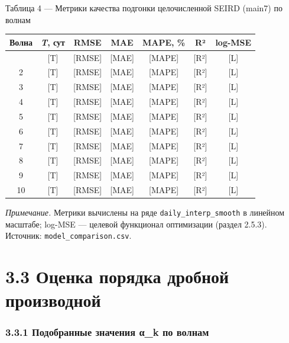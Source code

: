 \documentclass[12pt]{article}
\begin{document}
Таблица 4 --- Метрики качества подгонки целочисленной SEIRD (main7) по
волнам

{\def\LTcaptype{none} %
\begin{longtable}[]{@{}ccccccc@{}}
\toprule\noalign{}
Волна & \emph{T}, сут & RMSE & MAE & MAPE, \% & R² & log-MSE \\
\midrule\noalign{}
\endhead
\bottomrule\noalign{}
\endlastfoot
1 & {[}T{]} & {[}RMSE{]} & {[}MAE{]} & {[}MAPE{]} & {[}R²{]} &
{[}L{]} \\
2 & {[}T{]} & {[}RMSE{]} & {[}MAE{]} & {[}MAPE{]} & {[}R²{]} &
{[}L{]} \\
3 & {[}T{]} & {[}RMSE{]} & {[}MAE{]} & {[}MAPE{]} & {[}R²{]} &
{[}L{]} \\
4 & {[}T{]} & {[}RMSE{]} & {[}MAE{]} & {[}MAPE{]} & {[}R²{]} &
{[}L{]} \\
5 & {[}T{]} & {[}RMSE{]} & {[}MAE{]} & {[}MAPE{]} & {[}R²{]} &
{[}L{]} \\
6 & {[}T{]} & {[}RMSE{]} & {[}MAE{]} & {[}MAPE{]} & {[}R²{]} &
{[}L{]} \\
7 & {[}T{]} & {[}RMSE{]} & {[}MAE{]} & {[}MAPE{]} & {[}R²{]} &
{[}L{]} \\
8 & {[}T{]} & {[}RMSE{]} & {[}MAE{]} & {[}MAPE{]} & {[}R²{]} &
{[}L{]} \\
9 & {[}T{]} & {[}RMSE{]} & {[}MAE{]} & {[}MAPE{]} & {[}R²{]} &
{[}L{]} \\
10 & {[}T{]} & {[}RMSE{]} & {[}MAE{]} & {[}MAPE{]} & {[}R²{]} &
{[}L{]} \\
\end{longtable}
}

\emph{Примечание.} Метрики вычислены на ряде
\texttt{daily\_interp\_smooth} в линейном масштабе; log-MSE --- целевой
функционал оптимизации (раздел 2.5.3). Источник:
\texttt{model\_comparison.csv}.

\section{3.3 Оценка порядка дробной
производной}\label{ux43eux446ux435ux43dux43aux430-ux43fux43eux440ux44fux434ux43aux430-ux434ux440ux43eux431ux43dux43eux439-ux43fux440ux43eux438ux437ux432ux43eux434ux43dux43eux439}

\subsubsection{3.3.1 Подобранные значения α\_k по
волнам}\label{ux43fux43eux434ux43eux431ux440ux430ux43dux43dux44bux435-ux437ux43dux430ux447ux435ux43dux438ux44f-ux3b1_k-ux43fux43e-ux432ux43eux43bux43dux430ux43c}
\end{document}
